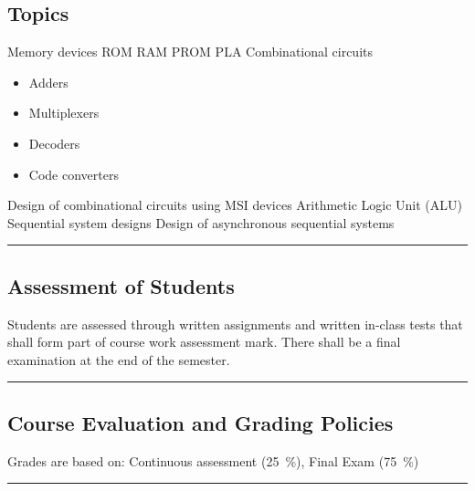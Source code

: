 \subsection*{Topics}
\begin{outline}
    \1 Memory devices
    \1 ROM
    \1 RAM
    \1 PROM
    \1 PLA
    \1 Combinational  circuits
    \begin{itemize}
        \item Adders
        \item Multiplexers
        \item Decoders
        \item Code converters
    \end{itemize}
    \1 Design of combinational  circuits using MSI devices
    \1 Arithmetic Logic Unit (ALU)
    \1 Sequential system designs
    \1 Design of  asynchronous sequential systems
\end{outline}
\vspace{2ex} \hrule\vspace{2ex}

\subsection*{Assessment of Students}
\begin{outline}
    \1 Students are assessed through written assignments and written in-class tests that shall form part of course work assessment mark.
    \1 There shall be a final examination at the end of the semester.
\end{outline}
\vspace{2ex}\hrule\vspace{2ex}

\subsection*{Course Evaluation and Grading Policies}
Grades are based on:
Continuous assessment (\qty{25}{\percent}),
Final Exam (\qty{75}{\percent})
\vspace{2ex}\hrule\vspace{2ex}


